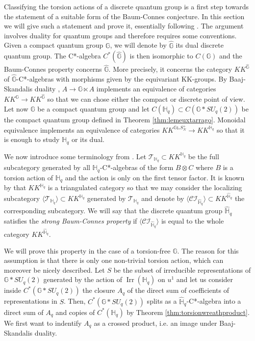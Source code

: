 \documentclass[a4paper, 11pt]{amsart}
\theoremstyle{plain}
\theoremstyle{definition}
\theoremstyle{remark}
\DeclareMathOperator{\Irr}{Irr}
\newcommand{\CI}{\mathcal{CI}}
\newcommand{\G}{\mathbb{G}}
\newcommand{\HH}{\mathbb{H}}
\newcommand{\T}{\mathcal{T}}
\begin{document}
Classifying the torsion actions of a discrete quantum group is a first step towards the statement of a suitable form of the Baum-Connes conjecture. In this section we will give such a statement and prove it, essentially following \cite{voigt2015structure}. The argument involves duality for quantum groups and therefore requires some conventions. Given a compact quantum group $\G$, we will denote by $\widehat{\G}$ its dual discrete quantum group. The C*-algebra $C^{*}(\widehat{\G})$ is then isomorphic to $C(\G)$ and the Baum-Connes property concerns $\widehat{\G}$. More precisely, it concerns the category $KK^{\widehat{\G}}$ of $\widehat{\G}$-C*-algebras with morphisms given by the equivariant KK-groups. By Baaj-Skandalis duality \cite{baaj1993unitaires}, $A\rightarrow \G\ltimes A$ implements an equivalence of categories $KK^{\G}\rightarrow KK^{\widehat{\G}}$ so that we can chose either the compact or discrete point of view. Let now $\G$ be a compact quantum group and let $C(\HH_{q})\subset C(\G\ast SU_{q}(2))$ be the compact quantum group defined in Theorem \ref{thm:lemeuxtarrago}. Monoidal equivalence implements an equivalence of categories $KK^{\G\wr_{\ast}S_{N}^{+}}\rightarrow KK^{\HH_{q}}$ so that it is enough to study $\HH_{q}$ or its dual.

We now introduce some terminology from \cite{meyer2008homological}. Let $\T_{\HH_{q}}\subset KK^{\HH_{q}}$ be the full subcategory generated by all $\HH_{q}$-C*-algebras of the form $B\otimes C$ where $B$ is a torsion action of $\HH_{q}$ and the action is only on the first tensor factor. It is known by \cite{meyer2006baum} that $KK^{\HH_{q}}$ is a triangulated category so that we may consider the localizing subcategory $\langle \T_{\HH_{q}}\rangle\subset KK^{\HH_{q}}$ generated by $\T_{\HH_{q}}$ and denote by $\langle\CI_{\widehat{\HH}_{q}}\rangle\subset KK^{\widehat{\HH}_{q}}$ the corresponding subcategory. We will say that the discrete quantum group $\widehat{\HH}_{q}$ satisfies the \emph{strong Baum-Connes property} if $\langle\CI_{\widehat{\HH}_{q}}\rangle$ is equal to the whole category $KK^{\widehat{\HH}_{q}}$.

We will prove this property in the case of a torsion-free $\G$. The reason for this assumption is that there is only one non-trivial torsion action, which can moreover be nicely described. Let $S$ be the subset of irreducible representations of $\G\ast SU_{q}(2)$ generated by the action of $\Irr(\HH_{q})$ on $u^{1}$ and let us consider inside $C^{*}(\G\ast SU_{q}(2))$ the closure $A_{q}$ of the direct sum of coefficients of representations in $S$. Then, $C^{*}(\G\ast SU_{q}(2))$ splits as a $\widehat{\HH}_{q}$-C*-algebra into a direct sum of $A_{q}$ and copies of $C^{*}(\HH_{q})$ by Theorem \ref{thm:torsionwreathproduct}. We first want to indentify $A_{q}$ as a crossed product, i.e. an image under Baaj-Skandalis duality.
\end{document}
